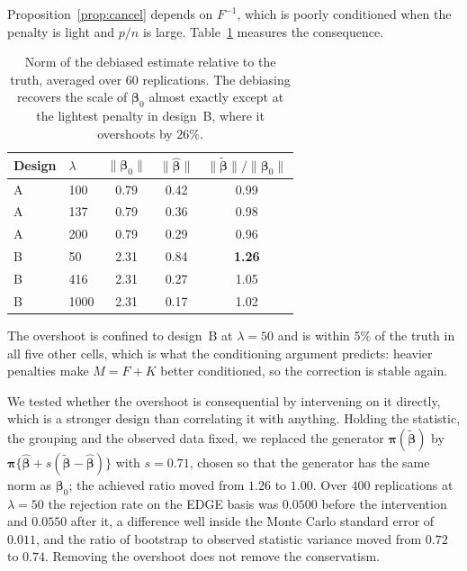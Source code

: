 \documentclass[11pt,a4paper]{article}
\newcommand{\bb}{\boldsymbol{\beta}}
\newcommand{\bbh}{\hat{\boldsymbol{\beta}}}
\newcommand{\bbt}{\tilde{\boldsymbol{\beta}}}
\newcommand{\bpi}{\boldsymbol{\pi}}
\theoremstyle{plain}
\theoremstyle{remark}
\begin{document}
Proposition~\ref{prop:cancel} depends on $F^{-1}$, which is poorly conditioned when the
penalty is light and $p/n$ is large. Table~\ref{tab:overshoot} measures the consequence.

\begin{table}[htbp]
\centering
\caption{Norm of the debiased estimate relative to the truth, averaged over $60$
replications. The debiasing recovers the scale of $\bb_0$ almost exactly except at the
lightest penalty in design~B, where it overshoots by $26\%$.}
\label{tab:overshoot}
\begin{tabular}{llccc}
\toprule
Design & $\lambda$ & $\|\bb_0\|$ & $\|\bbh\|$ & $\|\bbt\|/\|\bb_0\|$ \\
\midrule
A & 100  & 0.79 & 0.42 & 0.99 \\
A & 137  & 0.79 & 0.36 & 0.98 \\
A & 200  & 0.79 & 0.29 & 0.96 \\
\midrule
B & 50   & 2.31 & 0.84 & \textbf{1.26} \\
B & 416  & 2.31 & 0.27 & 1.05 \\
B & 1000 & 2.31 & 0.17 & 1.02 \\
\bottomrule
\end{tabular}
\end{table}

The overshoot is confined to design~B at $\lambda = 50$ and is within $5\%$ of the truth
in all five other cells, which is what the conditioning argument predicts: heavier
penalties make $M = F + K$ better conditioned, so the correction is stable again.

We tested whether the overshoot is consequential by intervening on it directly, which is
a stronger design than correlating it with anything. Holding the statistic, the grouping
and the observed data fixed, we replaced the generator $\bpi(\bbt)$ by
$\bpi\{\bbh + s(\bbt - \bbh)\}$ with $s = 0.71$, chosen so that the generator has the
same norm as $\bb_0$; the achieved ratio moved from $1.26$ to $1.00$. Over $400$
replications at $\lambda = 50$ the rejection rate on the EDGE basis was $0.0500$ before
the intervention and $0.0550$ after it, a difference well inside the Monte Carlo standard
error of $0.011$, and the ratio of bootstrap to observed statistic variance moved from
$0.72$ to $0.74$. Removing the overshoot does not remove the conservatism.
\end{document}
